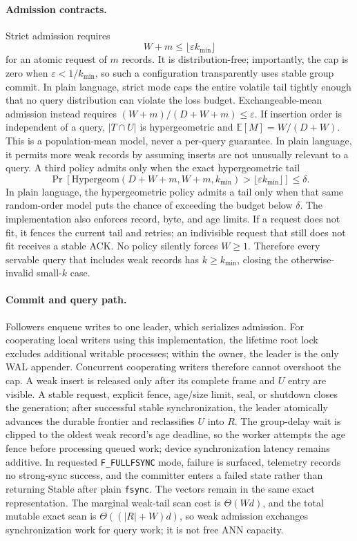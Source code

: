 \documentclass[sigconf,nonacm,balance=false]{acmart}
\newcommand{\fullfsync}{\texttt{F\_FULLFSYNC}}
\newcommand{\fsync}{\texttt{fsync}}
\begin{document}
\paragraph{Admission contracts.} Strict admission requires
\[
  W+m\le \lfloor\varepsilon k_{\min}\rfloor
\]
for an atomic request of $m$ records. It is distribution-free; importantly, the
cap is zero when $\varepsilon<1/k_{\min}$, so such a configuration transparently
uses stable group commit. In plain language, strict mode caps the entire volatile
tail tightly enough that no query distribution can violate the loss budget.
Exchangeable-mean admission instead requires
$(W+m)/(D+W+m)\le\varepsilon$. If insertion order is independent of a query,
$|T\cap U|$ is hypergeometric and $\mathbb{E}[M]=W/(D+W)$. This is a
population-mean model, never a per-query guarantee. In plain language, it permits
more weak records by assuming inserts are not unusually relevant to a query. A
third policy admits only
when the exact hypergeometric tail
\[
 \Pr[\mathrm{Hypergeom}(D+W+m,W+m,k_{\min})>
        \lfloor\varepsilon k_{\min}\rfloor]\le\delta .
\]
In plain language, the hypergeometric policy admits a tail only when that same
random-order model puts the chance of exceeding the budget below $\delta$.
The implementation also enforces record, byte, and age limits. If a request does
not fit, it fences the current tail and retries; an indivisible request that still
does not fit receives a stable ACK. No policy silently forces $W\ge1$. Therefore
every servable query that includes weak records has $k\ge k_{\min}$, closing the
otherwise-invalid small-$k$ case.

\paragraph{Commit and query path.} Followers enqueue writes to one leader, which
serializes admission. For cooperating local writers using this implementation,
the lifetime root lock excludes additional writable processes; within the owner,
the leader is the only WAL appender. Concurrent cooperating writers therefore
cannot overshoot the cap. A weak insert is released only after its complete frame
and $U$ entry are visible. A stable request, explicit fence, age/size limit, seal,
or shutdown closes the generation; after successful stable synchronization, the
leader atomically advances the durable frontier and reclassifies $U$ into $R$.
The group-delay wait is clipped to the oldest weak record's age deadline, so the
worker attempts the age fence before processing queued work; device
synchronization latency remains additive. In requested \fullfsync{} mode, failure is surfaced,
telemetry records no strong-sync success, and the committer enters a failed state
rather than returning Stable after plain \fsync{}.
The vectors remain in the same exact representation. The marginal weak-tail scan
cost is $\Theta(Wd)$, and the total mutable exact scan is
$\Theta((|R|+W)d)$, so weak admission exchanges synchronization work for query
work; it is not free ANN capacity.
\end{document}
